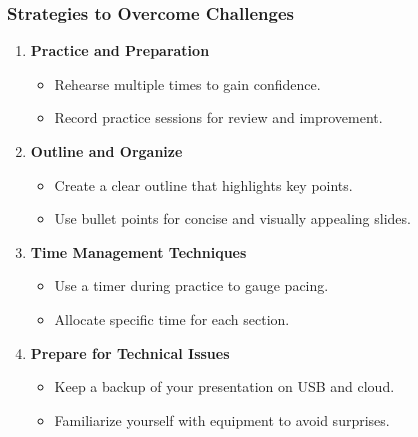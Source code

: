 \documentclass{beamer}
\begin{document}
\begin{frame}[fragile]
    \frametitle{Strategies to Overcome Challenges}
    \begin{enumerate}
        \item \textbf{Practice and Preparation}
            \begin{itemize}
                \item Rehearse multiple times to gain confidence.
                \item Record practice sessions for review and improvement.
            \end{itemize}
        
        \item \textbf{Outline and Organize}
            \begin{itemize}
                \item Create a clear outline that highlights key points.
                \item Use bullet points for concise and visually appealing slides.
            \end{itemize}
        
        \item \textbf{Time Management Techniques}
            \begin{itemize}
                \item Use a timer during practice to gauge pacing.
                \item Allocate specific time for each section.
            \end{itemize}
        
        \item \textbf{Prepare for Technical Issues}
            \begin{itemize}
                \item Keep a backup of your presentation on USB and cloud.
                \item Familiarize yourself with equipment to avoid surprises.
            \end{itemize}
    \end{enumerate}
\end{frame}
\end{document}

